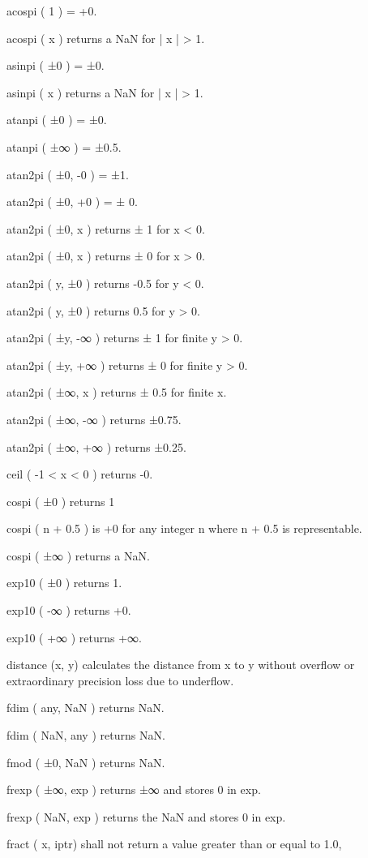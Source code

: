 acospi ( 1 ) = +0.\par
acospi ( x ) returns a NaN for | x | > 1.\par
\blank
asinpi ( ±0 ) = ±0.\par
asinpi ( x ) returns a NaN for | x | > 1.\par
\blank
atanpi ( ±0 ) = ±0.\par
atanpi ( ±∞ ) = ±0.5.\par
\blank
atan2pi ( ±0, -0 ) = ±1.\par
atan2pi ( ±0, +0 ) = ± 0.\par
atan2pi ( ±0, x ) returns ± 1 for x < 0.\par
atan2pi ( ±0, x ) returns ± 0 for x > 0.\par
atan2pi ( y, ±0 ) returns -0.5 for y < 0.\par
atan2pi ( y, ±0 ) returns 0.5 for y > 0.\par
atan2pi ( ±y, -∞ ) returns ± 1 for finite y > 0.\par
atan2pi ( ±y, +∞ ) returns ± 0 for finite y > 0.\par
atan2pi ( ±∞, x ) returns ± 0.5 for finite x.\par
atan2pi ( ±∞, -∞ ) returns ±0.75.\par
atan2pi ( ±∞, +∞ ) returns ±0.25.\par
\blank
ceil ( -1 < x < 0 ) returns -0.\par
\blank
cospi ( ±0 ) returns 1\par
cospi ( n + 0.5 ) is +0 for any integer n where n + 0.5 is representable.\par
cospi ( ±∞ ) returns a NaN.\par
\blank
exp10 ( ±0 ) returns 1.\par
exp10 ( -∞ ) returns +0.\par
exp10 ( +∞ ) returns +∞.\par
\blank
distance (x, y) calculates the distance from x to y without overflow or extraordinary
precision loss due to underflow.\par
\blank
fdim ( any, NaN ) returns NaN.\par
fdim ( NaN, any ) returns NaN.\par
\blank
fmod ( ±0, NaN ) returns NaN.\par
\blank
frexp ( ±∞, exp ) returns ±∞ and stores 0 in exp.\par
frexp ( NaN, exp ) returns the NaN and stores 0 in exp.\par
\blank
fract ( x, iptr) shall not return a value greater than or equal to 1.0,
